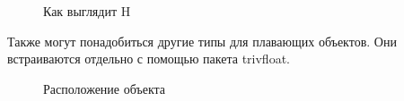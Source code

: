 \documentclass[
  english,
  russian,
  12pt,
  a4paper,
  DIV=11,
  numbers=noendperiod]{scrreprt}
\begin{document}
\begin{figure}


\caption{\label{fig-010}Как выглядит H}

\end{figure}%

Также могут понадобиться другие типы для плавающих объектов. Они
встраиваются отдельно с помощью пакета trivfloat.

\begin{figure}


\caption{\label{fig-011}Расположение объекта}

\end{figure}%
\end{document}
